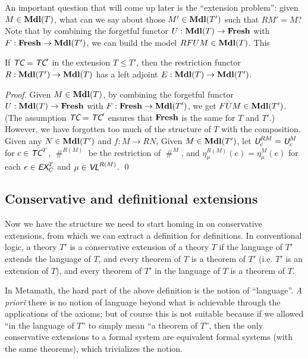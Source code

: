 \documentclass[runningheads,a4paper]{llncs}
\newcommand{\ec}{\textit{\textsf{EX}}_C} %
\newcommand{\tc}{\textit{\textsf{TC}}} %
\newcommand{\vl}{\textit{\textsf{VL}}} %
\newcommand{\uv}{\textit{\textsf{U}}} %
\newcommand{\fresh}{\mathbin{\#}}
\begin{document}
An important question that will come up later is the ``extension problem'': given $M\in{\bf Mdl}(T)$, what can we say about those $M'\in{\bf Mdl}(T')$ such that $RM'=M$? Note that by combining the forgetful functor $U:{\bf Mdl}(T)\to{\bf Fresh}$ with $F:{\bf Fresh}\to{\bf Mdl}(T')$, we can build the model $RFUM\in{\bf Mdl}(T)$. This 

\begin{theorem}\label{sec:resadj}
If $\tc=\tc'$ in the extension $T\le T'$, then the restriction functor $R:{\bf Mdl}(T')\to{\bf Mdl}(T)$ has a left adjoint $E:{\bf Mdl}(T)\to{\bf Mdl}(T')$. 
\end{theorem}
\begin{proof}
Given $M\in{\bf Mdl}(T)$, by combining the forgetful functor $U:{\bf Mdl}(T)\to{\bf Fresh}$ with $F:{\bf Fresh}\to{\bf Mdl}(T')$, we get $FUM\in{\bf Mdl}(T')$. (The assumption $\tc=\tc'$ ensures that $\bf Fresh$ is the same for $T$ and $T'$.) However, we have forgotten too much of the structure of $T$ with the composition. Given any $N\in{\bf Mdl}(T')$ and $f:M\to RN$,
Given $M\in{\bf Mdl}(T')$, let $\uv^{RM}_c=\uv^M_c$ for $c\in\tc^T$, $\fresh^{R(M)}$ be the restriction of $\fresh^M$, and $\eta^{R(M)}_\mu(e)=\eta^M_\mu(e)$ for each $e\in\ec^T$ and $\mu\in\vl^{R(M)}$.
\qed\end{proof}

\subsection{Conservative and definitional extensions}\label{sec:conservative}
Now we have the structure we need to start homing in on conservative extensions, from which we can extract a definition for definitions. In conventional logic, a theory $T'$ is a conservative extension of a theory $T$ if the language of $T'$ extends the language of $T$, and every theorem of $T$ is a theorem of $T'$ (i.e. $T'$ is an extension of $T$), and every theorem of $T'$ in the language of $T$ is a theorem of $T$.

In Metamath, the hard part of the above definition is the notion of ``language''. \textit{A priori} there is no notion of language beyond what is achievable through the applications of the axioms; but of course this is not suitable because if we allowed ``in the language of $T$'' to simply mean ``a theorem of $T$'', then the only conservative extensions to a formal system are equivalent formal systems (with the same theorems), which trivializes the notion.
\end{document}
